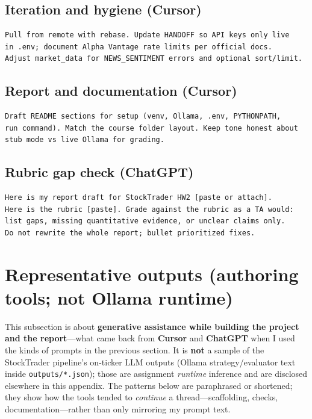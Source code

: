 \documentclass[11pt]{article}
\begin{document}
\subsection*{Iteration and hygiene (Cursor)}
\begin{verbatim}
Pull from remote with rebase. Update HANDOFF so API keys only live
in .env; document Alpha Vantage rate limits per official docs.
Adjust market_data for NEWS_SENTIMENT errors and optional sort/limit.
\end{verbatim}

\subsection*{Report and documentation (Cursor)}
\begin{verbatim}
Draft README sections for setup (venv, Ollama, .env, PYTHONPATH,
run command). Match the course folder layout. Keep tone honest about
stub mode vs live Ollama for grading.
\end{verbatim}

\subsection*{Rubric gap check (ChatGPT)}
\begin{verbatim}
Here is my report draft for StockTrader HW2 [paste or attach].
Here is the rubric [paste]. Grade against the rubric as a TA would:
list gaps, missing quantitative evidence, or unclear claims only.
Do not rewrite the whole report; bullet prioritized fixes.
\end{verbatim}

\section{Representative outputs (authoring tools; not Ollama runtime)}
This subsection is about \textbf{generative assistance while building the project and the report}---what came back from \textbf{Cursor} and \textbf{ChatGPT} when I used the kinds of prompts in the previous section. It is \textbf{not} a sample of the StockTrader pipeline's on-ticker LLM outputs (Ollama strategy/evaluator text inside \texttt{outputs/*.json}); those are assignment \emph{runtime} inference and are disclosed elsewhere in this appendix. The patterns below are paraphrased or shortened; they show how the tools tended to \emph{continue} a thread---scaffolding, checks, documentation---rather than only mirroring my prompt text.
\end{document}
